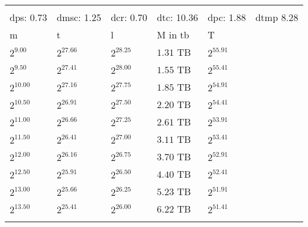 \begin{tabular}{llllll}
 &  &  &  &  &  \\
dps: 0.73 & dmsc: 1.25 & dcr: 0.70 & dtc: 10.36 & dpc: 1.88 & dtmp 8.28 \\
m & t & l & M in tb & T \\
$2^{9.00}$ & $2^{27.66}$ & $2^{28.25}$ & $1.31$ TB & $2^{55.91}$ \\
$2^{9.50}$ & $2^{27.41}$ & $2^{28.00}$ & $1.55$ TB & $2^{55.41}$ \\
$2^{10.00}$ & $2^{27.16}$ & $2^{27.75}$ & $1.85$ TB & $2^{54.91}$ \\
$2^{10.50}$ & $2^{26.91}$ & $2^{27.50}$ & $2.20$ TB & $2^{54.41}$ \\
$2^{11.00}$ & $2^{26.66}$ & $2^{27.25}$ & $2.61$ TB & $2^{53.91}$ \\
$2^{11.50}$ & $2^{26.41}$ & $2^{27.00}$ & $3.11$ TB & $2^{53.41}$ \\
$2^{12.00}$ & $2^{26.16}$ & $2^{26.75}$ & $3.70$ TB & $2^{52.91}$ \\
$2^{12.50}$ & $2^{25.91}$ & $2^{26.50}$ & $4.40$ TB & $2^{52.41}$ \\
$2^{13.00}$ & $2^{25.66}$ & $2^{26.25}$ & $5.23$ TB & $2^{51.91}$ \\
$2^{13.50}$ & $2^{25.41}$ & $2^{26.00}$ & $6.22$ TB & $2^{51.41}$ \\
 &  &  &  &  &  \\
\end{tabular}